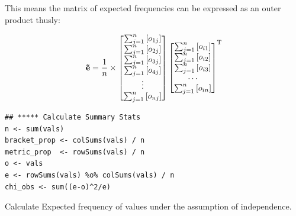 \documentclass[11pt]{article}
\begin{document}
This means the matrix of expected frequencies can be expressed as an outer product thusly:

\begin{align}
\label{eq:org00a6e2d}
\mathbf{\vec{e}}= \frac{1}{n} \times \begin{bmatrix} \sum^{n}_{j= 1} \left[ o_{1j} \right] \\  \sum^{n}_{j= 1}
\left[ o_{2j} \right]  \\ \sum^{n}_{j= 1} \left[ o_{3j} \right]   \\
\sum^{n}_{j= 1} \left[ o_{4j} \right]  \\ \vdots  \\
\sum^{n}_{j= 1} \left[ o_{nj} \right]     \end{bmatrix} 
\begin{bmatrix}  \sum^{n}_{j= 1} \left[ o_{i1}  \right] \\  \sum^{n}_{j= 1}
\left[ o_{i2}  \right] \\ \sum^{n}_{j= 1} \left[ o_{i3}  \right] \\ \cdots \\
\sum^{n}_{j= 1} \left[ o_{in}  \right]   \end{bmatrix}  ^{\normalsize \mathrm{T}} \label{eq:1}
\end{align}

\begin{listing}[htbp]
\begin{verbatim}
## ***** Calculate Summary Stats
n <- sum(vals)
bracket_prop <- colSums(vals) / n
metric_prop  <- rowSums(vals) / n
o <- vals
e <- rowSums(vals) %o% colSums(vals) / n
chi_obs <- sum((e-o)^2/e)
\end{verbatim}
\caption{\label{org610e916}Calculate Expected frequency of values under the assumption of independence.}
\end{listing}
\end{document}
